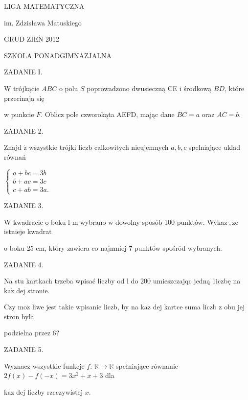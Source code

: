 \documentclass[a4paper,12pt]{article}
\begin{document}
LIGA MATEMATYCZNA

im. Zdzisława Matuskiego

GRUD Z$\mathrm{I}\mathrm{E}\acute{\mathrm{N}}$ 2012

SZKOLA PONADGIMNAZJALNA

ZADANIE I.

$\mathrm{W}$ trójkącie $ABC$ o polu $S$ poprowadzono dwusieczną CE i środkową $BD$, które przecinają się

w punkcie $F$. Oblicz pole czworokąta AEFD, mając dane $BC=a$ oraz $AC=b.$

ZADANIE 2.

Znajd $\acute{\mathrm{z}}$ wszystkie trójki liczb calkowitych nieujemnych $a, b, c$ spelniające uklad równań

$\left\{\begin{array}{l}
a+bc=3b\\
b+ac=3c\\
c+ab=3a.
\end{array}\right.$

ZADANIE 3.

$\mathrm{W}$ kwadracie o boku l $\mathrm{m}$ wybrano w dowolny sposób 100 punktów. Wykaz$\cdot, \dot{\mathrm{z}}\mathrm{e}$ istnieje kwadrat

o boku 25 cm, który zawiera co najmniej 7 punktów spośród wybranych.

ZADANIE 4.

Na stu kartkach trzeba wpisać liczby od l do 200 umieszczajqc jedną 1iczbę na $\mathrm{k}\mathrm{a}\dot{\mathrm{z}}$ dej stronie.

Czy $\mathrm{m}\mathrm{o}\dot{\mathrm{z}}$ liwe jest takie wpisanie liczb, by na $\mathrm{k}\mathrm{a}\dot{\mathrm{z}}$ dej kartce suma liczb z obu jej stron byla

podzielna przez 6?

ZADANIE 5.

Wyznacz wszystkie funkcje $f$: $\mathbb{R}\rightarrow \mathbb{R}$ spełniające równanie $2f(x)-f(-x)=3x^{2}+x+3$ dla

$\mathrm{k}\mathrm{a}\dot{\mathrm{z}}$ dej liczby rzeczywistej $x.$
\end{document}
